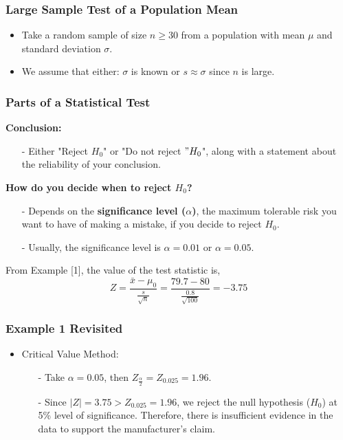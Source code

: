 \documentclass[12pt, letterpaper]{article}
\begin{document}
            \subsubsection*{Large Sample Test of a Population Mean}
                \begin{itemize}
                    \item Take a random sample of size $n \geq 30$ from a population with mean $\mu$ and standard deviation $\sigma$.
                    \item We assume that either: $\sigma$ is known or $s \approx \sigma$ since $n$ is large.
                \end{itemize}
            \subsubsection*{Parts of a Statistical Test}
                \textbf{Conclusion:}
                    \begin{itemize}
                        \item[-] Either "Reject $H_0$" or "Do not reject $"H_0$", along with a statement about the reliability of your conclusion.
                    \end{itemize}
                \textbf{How do you decide when to reject $H_0$?}
                    \begin{itemize}
                        \item[-] Depends on the \textbf{significance level ($\alpha$)}, the maximum tolerable risk you want to have of making a mistake, if you decide to reject $H_0$.
                        \item[-] Usually, the significance level is $\alpha = 0.01$ or $\alpha = 0.05$.
                    \end{itemize}
                From Example [1], the value of the test statistic is,
                \begin{equation*}
                    Z = \frac{\bar{x}-\mu_0}{\frac{s}{\sqrt{n}}} = \frac{79.7-80}{\frac{0.8}{\sqrt{100}}} = -3.75
                \end{equation*}
            \subsubsection*{Example 1 Revisited}
                \begin{itemize}
                    \item Critical Value Method:
                    \begin{itemize}
                        \item[-] Take $\alpha = 0.05$, then $Z_{\frac{\alpha}{2}} = Z_{0.025} = 1.96$.
                        \item[-] Since $|Z| = 3.75 > Z_{0.025} = 1.96$, we reject the null hypothesis ($H_0$) at 5\% level of significance. Therefore, there is insufficient evidence in the data to support the manufacturer's claim.
                    \end{itemize}
                \end{itemize}
\end{document}
